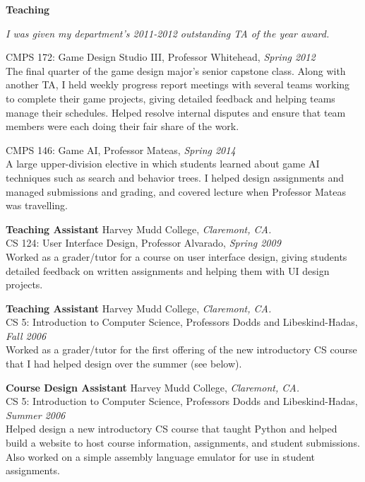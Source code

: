 \documentclass[11pt]{article}
\newenvironment{sct}[1]{%
  \vspace{8pt}\textbf{\Large #1} \hrulefill\vspace{6pt}
  \begin{adjustwidth}{6pt}{0pt}
}{%
  \end{adjustwidth}
}
\newcommand{\experience}[6]{%
  \textbf{#1} #2, \textit{#3.} \\
  #4, \textit{#5} \vspace{6pt} \\
  #6 \vspace{8pt}
}
\begin{document}
\begin{sct}{Teaching}
{\textit{I was given my department's 2011-2012 outstanding TA of the year award.}
\vspace{6pt}

CMPS 172: Game Design Studio III, Professor Whitehead, \textit{Spring 2012} \vspace{2pt} \\
The final quarter of the game design major’s senior capstone class. Along with
another TA, I held weekly progress report meetings with several teams working
to complete their game projects, giving detailed feedback and helping teams
manage their schedules. Helped resolve internal disputes and ensure that team
members were each doing their fair share of the work.
\vspace{6pt}

CMPS 146: Game AI, Professor Mateas, \textit{Spring 2014} \vspace{2pt} \\
A large upper-division elective in which students learned about game AI
techniques such as search and behavior trees. I helped design assignments and
managed submissions and grading, and covered lecture when Professor Mateas was
travelling.
}

\experience{Teaching Assistant}{Harvey Mudd College}{Claremont, CA}%
{CS 124: User Interface Design, Professor Alvarado}{Spring 2009}{
Worked as a grader/tutor for a course on user interface design, giving students
detailed feedback on written assignments and helping them with UI design
projects.
}

\experience{Teaching Assistant}{Harvey Mudd College}{Claremont, CA}%
{CS 5: Introduction to Computer Science, Professors Dodds and Libeskind-Hadas}{Fall 2006}{
Worked as a grader/tutor for the first offering of the new introductory CS
course that I had helped design over the summer (see below).
}

\experience{Course Design Assistant}{Harvey Mudd College}{Claremont, CA}%
{CS 5: Introduction to Computer Science, Professors Dodds and Libeskind-Hadas}{Summer 2006}{
Helped design a new introductory CS course that taught Python and helped build
a website to host course information, assignments, and student submissions.
Also worked on a simple assembly language emulator for use in student
assignments.
}

\end{sct}

\newpage
\end{document}
